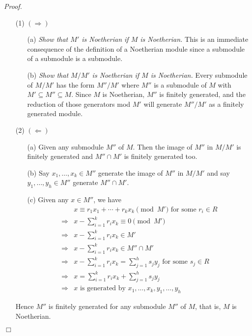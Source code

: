 \documentclass{article}
\begin{document}
\emph{Proof.}
\begin{enumerate}
\item[(1)]
$(\Longrightarrow)$
  \begin{enumerate}
  \item[(a)]
  \emph{Show that $M'$ is Noetherian if $M$ is Noetherian.}
  This is an immediate consequence of the definition of a Noetherian module
  since a submodule of a submodule is a submodule.
  \item[(b)]
  \emph{Show that $M/M'$ is Noetherian if $M$ is Noetherian.}
  Every submodule of $M/M'$ has the form $M''/M'$
  where $M''$ is a submodule of $M$ with $M' \subseteq M'' \subseteq M$.
  Since $M$ is Noetherian, $M''$ is finitely generated,
  and the reduction of those generators mod $M'$ will generate $M''/M'$
  as a finitely generated module.
  \end{enumerate}
\item[(2)]
$(\Longleftarrow)$
  \begin{enumerate}
  \item[(a)]
  Given any submodule $M''$ of $M$.
  Then the image of $M''$ in $M/M'$ is finitely generated and
  $M'' \cap M'$ is finitely generated too.
  \item[(b)]
  Say $x_1, \ldots, x_k \in M''$ generate the image of $M''$ in $M/M'$ and
  say $y_1, \ldots, y_h \in M''$ generate $M'' \cap M'$.
  \item[(c)]
  Given any $x \in M''$, we have
  \begin{align*}
  &x \equiv r_1 x_1 + \cdots + r_k x_k \pmod{M'} \text{ for some } r_i \in R \\
  \Longrightarrow&
  x - \sum_{i=1}^{k} r_i x_k \equiv 0 \pmod{M'} \\
  \Longrightarrow&
  x - \sum_{i=1}^{k} r_i x_k \in M' \\
  \Longrightarrow&
  x - \sum_{i=1}^{k} r_i x_k \in M'' \cap M' \\
  \Longrightarrow&
  x - \sum_{i=1}^{k} r_i x_k = \sum_{j=1}^{h} s_j y_j \text{ for some } s_j \in R \\
  \Longrightarrow&
  x = \sum_{i=1}^{k} r_i x_k + \sum_{j=1}^{h} s_j y_j \\
  \Longrightarrow&
  \text{$x$ is generated by $x_1, \ldots, x_k, y_1, \ldots, y_h$}
  \end{align*}
  \end{enumerate}
  Hence $M''$ is finitely generated for any submodule $M''$ of $M$,
  that is, $M$ is Noetherian.
\end{enumerate}
$\Box$ \\\\
\end{document}

